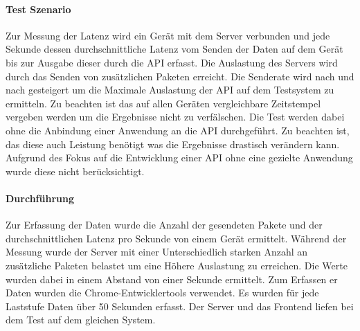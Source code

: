 \documentclass[a4paper]{spie}  %
\begin{document}
\paragraph{Test Szenario} Zur Messung der Latenz wird ein Gerät mit dem Server verbunden und jede Sekunde dessen durchschnittliche Latenz vom Senden der Daten auf dem Gerät bis zur Ausgabe dieser durch die API erfasst. Die Auslastung des Servers wird durch das Senden von zusätzlichen Paketen erreicht. Die Senderate wird nach und nach gesteigert um die Maximale Auslastung der API auf dem Testsystem zu ermitteln. Zu beachten ist das auf allen Geräten vergleichbare Zeitstempel vergeben werden um die Ergebnisse nicht zu verfälschen. Die Test werden dabei ohne die Anbindung einer Anwendung an die API durchgeführt. Zu beachten ist, das diese auch Leistung benötigt was die Ergebnisse drastisch verändern kann. Aufgrund des Fokus auf die Entwicklung einer API ohne eine gezielte Anwendung wurde diese nicht berücksichtigt.


\paragraph{Durchführung}
Zur Erfassung der Daten wurde die Anzahl der gesendeten Pakete und der durchschnittlichen Latenz pro Sekunde von einem Gerät ermittelt. Während der Messung wurde der Server mit einer Unterschiedlich starken Anzahl an zusätzliche Paketen belastet um eine Höhere Auslastung zu erreichen. Die Werte wurden dabei in einem Abstand von einer Sekunde ermittelt. Zum Erfassen er Daten wurden die Chrome-Entwicklertools verwendet. Es wurden für jede Laststufe Daten über 50 Sekunden erfasst. Der Server und das Frontend liefen bei dem Test auf dem gleichen System.
\end{document}
